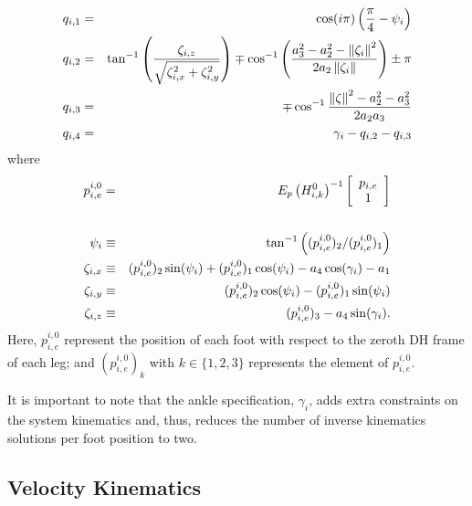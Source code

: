 				\begin{eqnarray}
					q_{i,1} &=& \cos(i\pi) \left( \frac{\pi}{4} - \psi_{i} \right) \nonumber\\
					q_{i,2} &=&	\tan^{-1} \left(\frac{\zeta_{i,z}}{\sqrt{\zeta_{i,x}^2+\zeta_{i,y}^2}}\right) \mp \cos^{-1}\left(\frac{a_{3}^2-a_{2}^2-\left\lVert\zeta_{i}\right\rVert^2}{2 a_{2} \left\lVert\zeta_{i}\right\rVert }\right) \pm \pi 	\nonumber\\
					q_{i,3} &=&	\mp \cos^{-1}\frac{\left\lVert\zeta\right\rVert^2-a_{2}^2-a_{3}^2}{2 a_{2} a_{3}} \nonumber\\
					q_{i,4} &=&	\gamma_{i} - q_{i,2} - q_{i,3}	
				\end{eqnarray}
				where
				\begin{eqnarray}
					{p}_{i,e}^{i,0} &=&
					E_{p} 
					\left( {H}_{i,k}^{0} \right) ^{-1}
					\left[
						\begin{array}{c}
							{p}_{i,e} 		\\
							1 				\\ 	
						\end{array}
					\right]	\nonumber\\																						\nonumber\\
					\psi_{i} 	&\equiv&	\tan^{-1}\left( ({p}_{i,e}^{i,0})_{2}/({p}_{i,e}^{i,0})_{1} \right)												\nonumber\\
					\zeta_{i,x} &\equiv& 	({p}_{i,e}^{i,0})_{2} \sin(\psi_{i}) + ({p}_{i,e}^{i,0})_{1} \cos(\psi_{i}) - a_{4} \cos(\gamma_{i}) - a_{1} 						\nonumber\\
					\zeta_{i,y} &\equiv& 	({p}_{i,e}^{i,0})_{2} \cos(\psi_{i}) - ({p}_{i,e}^{i,0})_{1} \sin(\psi_{i}) 											\nonumber\\
					\zeta_{i,z}	&\equiv&  	({p}_{i,e}^{i,0})_{3} - a_{4} \sin(\gamma_{i}) .
				\end{eqnarray}
			Here, ${p}_{i,e}^{i,0}$ represent the position of each \Ith foot with respect to the zeroth DH frame of each \Ith leg; and $({p}_{i,e}^{i,0})_{k}$ with $k\in\{1,2,3\}$ represents the \Kth element of ${p}_{i,e}^{i,0}$.

			It is important to note that the ankle specification,  $\gamma_{i}$, adds extra constraints on the system kinematics and, thus, reduces the number of inverse kinematics solutions per foot position to two.




		\subsection{Velocity Kinematics}

